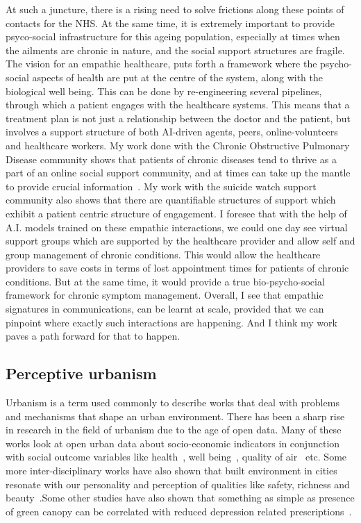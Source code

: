 At such a juncture, there is a rising need to solve frictions along these points of contacts for the NHS. At the same time, it is extremely important to provide psyco-social infrastructure for this ageing population, especially at times when the ailments are chronic in nature, and the social support structures are fragile. 
The vision for an empathic healthcare, puts forth a framework where the psycho-social aspects of health are put at the centre of the system, along with the biological well being. This can be done by re-engineering several pipelines, through which a patient engages with the healthcare systems. This means that a treatment plan is not just a relationship between the doctor and the patient, but involves a support structure of both AI-driven agents, peers, online-volunteers and healthcare workers. My work done with the Chronic Obstructive Pulmonary Disease community shows that patients of chronic diseases tend to thrive as a part of an online social support community, and at times can take up the mantle to provide crucial information~\cite{joglekar2018online}. My work with the suicide watch support community also shows that there are quantifiable structures of support which exhibit a patient centric structure of engagement. I foresee that with the help of A.I. models trained on these empathic interactions, we could one day see virtual support groups which are supported by the healthcare provider and allow self and group management of chronic conditions. This would allow the healthcare providers to save costs in terms of lost appointment times for patients of chronic conditions. But at the same time, it would provide a true bio-psycho-social framework for chronic symptom management. Overall, I see that empathic signatures in communications, can be learnt at scale, provided that we can pinpoint where exactly such interactions are happening. And I think my work paves a path forward for that to happen. 


\subsection{Perceptive urbanism}
Urbanism is a term used commonly to describe works that deal with problems and mechanisms that shape an urban environment. There has been a sharp rise in research in the field of urbanism due to the age of open data. Many of these works look at open urban data about socio-economic indicators in conjunction with social outcome variables like health~\cite{scholes2012persistent,venerandi2015measuring}, well being~\cite{cox2017doses}, quality of air~\cite{mitchell2003environmental} etc. 
Some more inter-disciplinary works have also shown that built environment in cities resonate with our personality and perception of qualities like safety, richness and beauty~\cite{de2016safer,dubey2016deep}.Some other studies have also shown that something as simple as presence of green canopy can be correlated with reduced depression related prescriptions~\cite{helbich2018more}.

